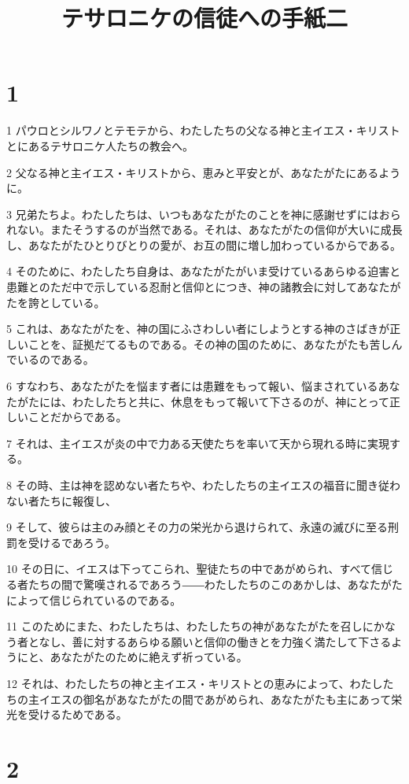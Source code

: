 

\title{テサロニケの信徒への手紙二}


\chapter{1}

\par 1 パウロとシルワノとテモテから、わたしたちの父なる神と主イエス・キリストとにあるテサロニケ人たちの教会へ。
\par 2 父なる神と主イエス・キリストから、恵みと平安とが、あなたがたにあるように。
\par 3 兄弟たちよ。わたしたちは、いつもあなたがたのことを神に感謝せずにはおられない。またそうするのが当然である。それは、あなたがたの信仰が大いに成長し、あなたがたひとりびとりの愛が、お互の間に増し加わっているからである。
\par 4 そのために、わたしたち自身は、あなたがたがいま受けているあらゆる迫害と患難とのただ中で示している忍耐と信仰とにつき、神の諸教会に対してあなたがたを誇としている。
\par 5 これは、あなたがたを、神の国にふさわしい者にしようとする神のさばきが正しいことを、証拠だてるものである。その神の国のために、あなたがたも苦しんでいるのである。
\par 6 すなわち、あなたがたを悩ます者には患難をもって報い、悩まされているあなたがたには、わたしたちと共に、休息をもって報いて下さるのが、神にとって正しいことだからである。
\par 7 それは、主イエスが炎の中で力ある天使たちを率いて天から現れる時に実現する。
\par 8 その時、主は神を認めない者たちや、わたしたちの主イエスの福音に聞き従わない者たちに報復し、
\par 9 そして、彼らは主のみ顔とその力の栄光から退けられて、永遠の滅びに至る刑罰を受けるであろう。
\par 10 その日に、イエスは下ってこられ、聖徒たちの中であがめられ、すべて信じる者たちの間で驚嘆されるであろう――わたしたちのこのあかしは、あなたがたによって信じられているのである。
\par 11 このためにまた、わたしたちは、わたしたちの神があなたがたを召しにかなう者となし、善に対するあらゆる願いと信仰の働きとを力強く満たして下さるようにと、あなたがたのために絶えず祈っている。
\par 12 それは、わたしたちの神と主イエス・キリストとの恵みによって、わたしたちの主イエスの御名があなたがたの間であがめられ、あなたがたも主にあって栄光を受けるためである。

\chapter{2}

